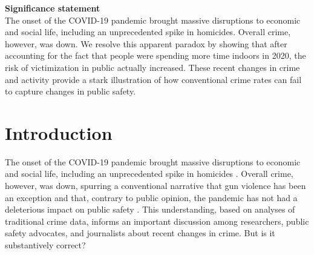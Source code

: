 \documentclass[12pt]{article}
\begin{document}
\noindent


\thispagestyle{empty}\baselineskip\newpage{}





\newpage
\setcounter{page}{1}

\begin{tcolorbox}
\textbf{Significance statement}  \\ 
The onset of the COVID-19 pandemic brought massive disruptions to economic and social life, including an unprecedented spike in homicides. Overall crime, however, was down. We resolve this apparent paradox by showing that after accounting for the fact that people were spending more time indoors in 2020, the risk of victimization in public actually increased. These recent changes in crime and activity provide a stark illustration of how conventional crime rates can fail to capture changes in public safety.

\end{tcolorbox}

\section{Introduction}
The onset of the COVID-19 pandemic brought massive disruptions to economic and social life, including an unprecedented spike in homicides \citep{cdc2020hom}. Overall crime, however, was down, spurring a conventional narrative that gun violence has been an exception \citep{graham2021atlantic, nass2020trace} and that, contrary to public opinion, the pandemic has not had a deleterious impact on public safety \citep{ashby2020initial,abrams2021covid,koerth2020many}. This understanding, based on analyses of traditional crime data, informs an important discussion among researchers, public safety advocates, and journalists about recent changes in crime. But is it substantively correct?  
\end{document}

